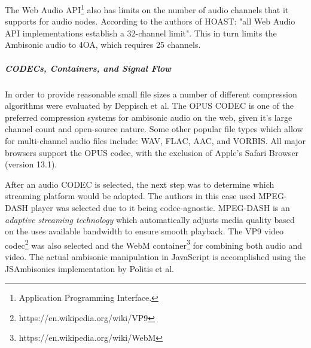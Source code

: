 The Web Audio API\footnote{Application Programming Interface.} also has limits on the number of audio channels that it supports for audio nodes. According to the authors of HOAST: "all Web Audio API implementations establish a 32-channel limit". This in turn limits the Ambisonic audio to 4OA, which requires 25 channels. 

\subparagraph{CODECs, Containers, and Signal Flow}

In order to provide reasonable small file sizes a number of different compression algorithms were evaluated by Deppisch et al. The OPUS CODEC is one of the preferred compression systems for ambisonic audio on the web, given it's large channel count and open-source nature. Some other popular file types which allow for multi-channel audio files include: WAV, FLAC, AAC, and VORBIS. All major browsers support the OPUS codec, with the exclusion of Apple's Safari Browser (version 13.1). 

After an audio CODEC is selected, the next step was to determine which streaming platform would be adopted. The authors in this case used MPEG-DASH player was selected due to it being codec-agnostic. MPEG-DASH is an \textit{adaptive streaming technology} which automatically adjusts media quality based on the uses available bandwidth to ensure smooth playback. The VP9 video codec\footnote{https://en.wikipedia.org/wiki/VP9} was also selected and the WebM container\footnote{https://en.wikipedia.org/wiki/WebM} for combining both audio and video. The actual ambisonic manipulation in JavaScript is accomplished using the JSAmbisonics implementation by Politis et al. 











